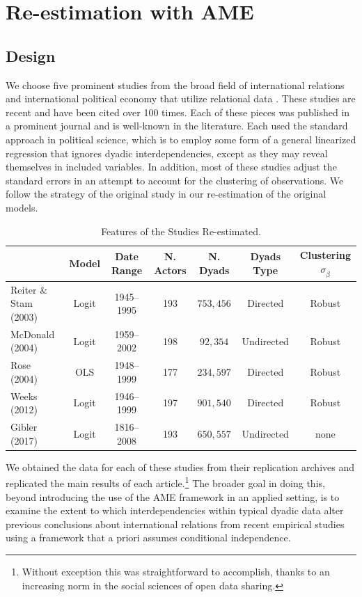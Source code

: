 \section{\textbf{Re-estimation with AME}}
 
\subsection{Design}

We choose five prominent studies from the broad field of international relations and international political economy that utilize relational data \citep{reiter:stam:2003, mcdonald:2004,  rose:2004, weeks:2012, gibler:2017}. These studies are recent and have been cited over 100 times. Each of these pieces was published in a prominent journal and is well-known in the literature. Each used the standard approach in political science, which is to employ some form of a general linearized regression that ignores dyadic interdependencies, except as they may reveal themselves in included variables. In addition, most of these studies adjust the standard errors in an attempt to account for the clustering of observations. We follow the strategy of the original study in our re-estimation of the original models. 

\begin{table}
\caption{Features of the Studies Re-estimated.}
	\begin{tabular}{lcccccc}
		& Model &  Date Range & N. Actors  & N. Dyads & Dyads Type & Clustering $\sigma_{\hat{\beta}}$ \\ \toprule
		Reiter \& Stam (2003) &Logit &1945--1995 &  193 & $753,456$ & Directed & Robust \\	
		McDonald (2004) & Logit &1959--2002 & 198 & $92,354$ & Undirected & Robust\\
		Rose (2004) & OLS & 1948--1999 & 177 & $234,597$ & Directed & Robust \\	 
		Weeks (2012) & Logit & 1946--1999 &197 &  $901,540$ & Directed & Robust \\
		Gibler (2017) & Logit & 1816--2008 &193 &   $650,557$ & Undirected & none \\ \bottomrule
	\end{tabular}
\end{table}

We obtained the data for each of these studies from their replication archives and replicated the main results of each article.\footnote{Without exception this was straightforward to accomplish, thanks to an increasing norm in the social sciences of open data sharing.} The broader goal in doing this, beyond introducing the use of the AME framework in an applied setting, is to examine the extent to which interdependencies within typical dyadic data alter previous conclusions about international relations from recent empirical studies using a framework that a priori assumes conditional independence. 

